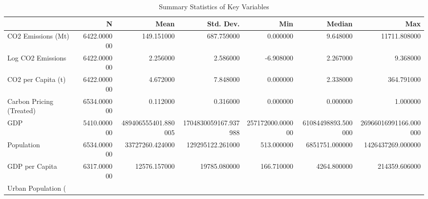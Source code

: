 \begin{table}[htbp]
\caption{Summary Statistics of Key Variables}
\label{tab:summary_stats}
\begin{tabular}{lrrrrrr}
\toprule
 & N & Mean & Std. Dev. & Min & Median & Max \\
\midrule
CO2 Emissions (Mt) & 6422.000000 & 149.151000 & 687.759000 & 0.000000 & 9.648000 & 11711.808000 \\
Log CO2 Emissions & 6422.000000 & 2.256000 & 2.586000 & -6.908000 & 2.267000 & 9.368000 \\
CO2 per Capita (t) & 6422.000000 & 4.672000 & 7.848000 & 0.000000 & 2.338000 & 364.791000 \\
Carbon Pricing (Treated) & 6534.000000 & 0.112000 & 0.316000 & 0.000000 & 0.000000 & 1.000000 \\
GDP & 5410.000000 & 489406555401.880005 & 1704830059167.937988 & 257172000.000000 & 61084498893.500000 & 26966016991166.000000 \\
Population & 6534.000000 & 33727260.424000 & 129295122.261000 & 513.000000 & 6851751.000000 & 1426437269.000000 \\
GDP per Capita & 6317.000000 & 12576.157000 & 19785.080000 & 166.710000 & 4264.800000 & 214359.606000 \\
Urban Population (%
\bottomrule
\end{tabular}
\end{table}
